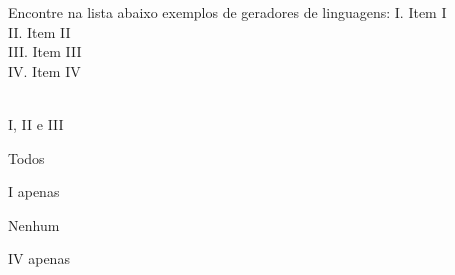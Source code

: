 \question[10]
Encontre na lista abaixo exemplos de geradores de linguagens:
I. Item I\\
II. Item II\\
III. Item III\\
IV. Item IV\\
\\
\begin{choices}
\item I, II e III
\item Todos
\item I apenas %
\item Nenhum
\item IV apenas
\end{choices}
\answerline

